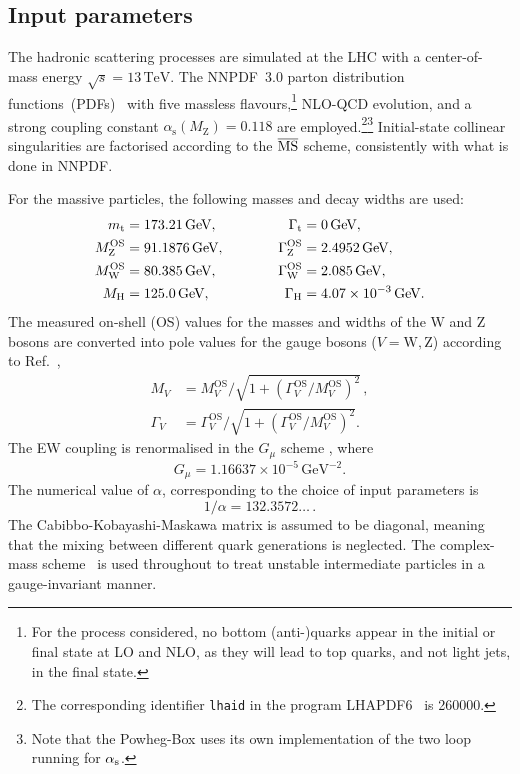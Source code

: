 \documentclass[twocolumn,epjc3]{svjour3} %
\newcommand{\PH}{\ensuremath{\text{H}}\xspace}
\newcommand{\Pt}{\ensuremath{\text{t}}\xspace}
\newcommand{\PW}{\ensuremath{\text{W}}\xspace}
\newcommand{\PZ}{\ensuremath{\text{Z}}\xspace}
\newcommand{\Mt}{\ensuremath{m_\Pt}\xspace}
\newcommand{\MWOS}{\ensuremath{M_\PW^\text{OS}}\xspace}
\newcommand{\MZOS}{\ensuremath{M_\PZ^\text{OS}}\xspace}
\newcommand{\MZ}{\ensuremath{M_\PZ}\xspace}
\newcommand{\Gt}{\ensuremath{\Gamma_\Pt}\xspace}
\newcommand{\GH}{\ensuremath{\Gamma_\PH}\xspace}
\newcommand{\GZOS}{\ensuremath{\Gamma_\PZ^\text{OS}}\xspace}
\newcommand{\GWOS}{\ensuremath{\Gamma_\PW^\text{OS}}\xspace}
\newcommand{\GeV}{\ensuremath{\,\text{GeV}}\xspace}
\newcommand{\TeV}{\ensuremath{\,\text{TeV}}\xspace}
\newcommand{\alphas}{\ensuremath{\alpha_\text{s}}\xspace}
\newcommand{\MVOS}{\ensuremath{M_{V}^\text{OS}}\xspace}%
\newcommand{\GVOS}{\ensuremath{\Gamma_{V}^\text{OS}}\xspace}%
\newlength{\width}
\begin{document}
    \subsection{Input parameters}
        \label{subsec:inputpar}
    The hadronic scattering processes are simulated at the LHC with a center-of-mass energy $\sqrt s = 13 \TeV$.
    The NNPDF~3.0 parton distribution functions~(PDFs)~\cite{Ball:2014uwa} with five massless flavours,\footnote{For the process considered, no bottom (anti-)quarks appear in the initial or final state at LO and NLO, as they will lead to top quarks, and not light jets, in the final state.} 
    NLO-QCD evolution, and a strong coupling constant $\alphas\left( \MZ \right) = 0.118$ are employed.\footnote{The corresponding identifier {\tt lhaid} in the program LHAPDF6~\cite{Buckley:2014ana} is 260000.}\footnote{Note that the {\sc Powheg-Box} uses its own implementation of the two loop running for $\alpha_{\rm s}$.}
    Initial-state collinear singularities are factorised according to the ${\overline{\rm MS}}$ scheme, consistently with what is done in NNPDF.

    For the massive particles, the following masses and decay widths are used:
    \begin{alignat}{2}
                      \Mt   &=  173.21\GeV,       & \quad \quad \quad \Gt &= 0 \GeV,  \nonumber \\
                    \MZOS &=  91.1876\GeV,      & \quad \quad \quad \GZOS &= 2.4952\GeV,  \nonumber \\
                    \MWOS &=  80.385\GeV,       & \GWOS &= 2.085\GeV,  \nonumber \\
                    M_{\rm H} &=  125.0\GeV,       &  \GH   &=  4.07 \times 10^{-3}\GeV.
    \end{alignat}
    The measured on-shell (OS) values for the masses and widths of the W and Z bosons are converted into pole values for the gauge bosons ($V=\PW,\PZ$) according to Ref.~\cite{Bardin:1988xt},
    \begin{equation}
    \begin{split}
            M_V &= \MVOS/\sqrt{1+(\GVOS/\MVOS)^2}\,, \\
       \Gamma_V &= \GVOS/\sqrt{1+(\GVOS/\MVOS)^2}.
    \end{split}
    \end{equation}
    The EW coupling is renormalised in the $G_\mu$ scheme \cite{Denner:2000bj}, where
    \begin{equation}
        G_{\mu}    = 1.16637\times 10^{-5}\GeV^{-2}.
    \end{equation}
    The numerical value of $\alpha$, corresponding to the choice of input parameters is
    \begin{equation}
     1/\alpha = 132.3572\ldots\,.
    \end{equation}
    The Cabibbo-Kobayashi-Maskawa matrix is assumed to be diagonal, meaning that the mixing between different quark generations is neglected.
    The complex-mass scheme~\cite{Denner:1999gp,Denner:2005fg,Denner:2006ic} is used throughout to treat unstable intermediate particles in a gauge-invariant manner.
\end{document}
